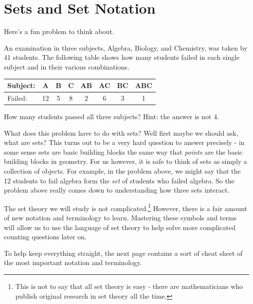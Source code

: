 \documentclass[12pt]{article}
\begin{document}
\section{Sets and Set Notation}

Here's a fun problem to think about.

\begin{problem}
An examination in three subjects, Algebra, Biology, and Chemistry, was taken
by 41 students. The following table shows how many students failed in each
single subject and in their various combinations.
\begin{center}
\begin{tabular}{|l|c|c|c|c|c|c|c|}
\hline
 Subject: & A & B & C & AB & AC & BC & ABC\\
\hline
Failed: & 12 & 5 & 8 & 2 & 6 & 3 & 1\\
\hline
\end{tabular}
\end{center}

How many students passed all three subjects?  Hint: the answer is not 4.
\end{problem}

What does this problem have to do with sets?  Well first maybe we should ask, what are sets?  This turns out to be a very hard question to answer precisely - in some sense sets are basic building blocks the same way that {\em points} are the basic building blocks in geometry.  For us however, it is safe to think of sets as simply a collection of objects.  For example, in the problem above, we might say that the 12 students to fail algebra form the {\em set} of students who failed algebra.  So the problem above really comes down to understanding how three sets interact.  

The set theory we will study is not complicated.\footnote{This is not to say that all set theory is easy - there are mathematicians who publish original research in set theory all the time.} However, there is a fair amount of new notation and terminology to learn.  Mastering these symbols and terms will allow us to use the language of set theory to help solve more complicated counting questions later on.

To help keep everything straight, the next page contains a sort of cheat sheet of the most important notation and terminology.  
\end{document}
